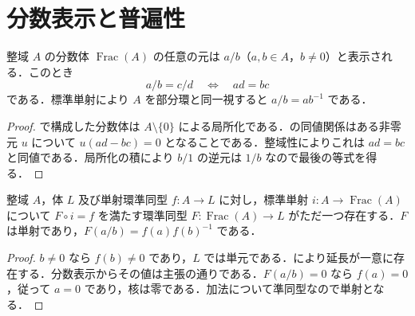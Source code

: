 \section{分数表示と普遍性}
\begin{prop}[分数体の分数表示]
整域 $A$ の分数体 $\operatorname{Frac}(A)$ の任意の元は $a/b$（$a,b\in A$，$b\ne0$）と表示される．このとき
\[
a/b=c/d\quad\Longleftrightarrow\quad ad=bc
\]
である．標準単射により $A$ を部分環と同一視すると $a/b=ab^{-1}$ である．
\end{prop}
\begin{proof}
で構成した分数体は $A\setminus\{0\}$ による局所化である．の同値関係はある非零元 $u$ について $u(ad-bc)=0$ となることである．整域性によりこれは $ad=bc$ と同値である．局所化の積により $b/1$ の逆元は $1/b$ なので最後の等式を得る．
\end{proof}
\begin{prop}[分数体の普遍性]
整域 $A$，体 $L$ 及び単射環準同型 $f:A\to L$ に対し，標準単射 $i:A\to\operatorname{Frac}(A)$ について $F\circ i=f$ を満たす環準同型 $F:\operatorname{Frac}(A)\to L$ がただ一つ存在する．$F$ は単射であり，$F(a/b)=f(a)f(b)^{-1}$ である．
\end{prop}
\begin{proof}
$b\ne0$ なら $f(b)\ne0$ であり，$L$ では単元である．により延長が一意に存在する．分数表示からその値は主張の通りである．$F(a/b)=0$ なら $f(a)=0$，従って $a=0$ であり，核は零である．加法について準同型なので単射となる．
\end{proof}
